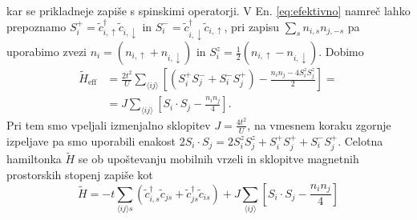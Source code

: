 \documentclass[10pt,a4paper]{article}
\begin{document}
kar se prikladneje zapiše s spinskimi operatorji. V En. \eqref{eq:efektivno} namreč lahko prepoznamo $S_i^+=\tilde{c}^\dagger_{i,\uparrow}\tilde{c}_{i,\downarrow}$ in $S_i^-=\tilde{c}^\dagger_{i,\downarrow}\tilde{c}_{i,\uparrow}$, pri zapisu $\sum\limits_{s} n_{i,s}n_{j,-s}$ pa uporabimo zvezi $n_i=\left( n_{i,\uparrow} + n_{i, \downarrow}\right)$ in $S_i^z=\frac{1}{2}\left(n_{i, \uparrow} - n_{i, \downarrow} \right)$. Dobimo
\begin{equation}\label{eq:stanja}
\begin{split}
\tilde{H}_\mathrm{eff}& = \frac{2t^2}{U} \sum\limits_{\langle ij \rangle}\left[ \left( S_i^+S_j^- + S_i^-S_j^+\right) - \frac{n_i n_j - 4S_i^zS_j^z}{2}\right]=\\
&=J\sum\limits_{\langle ij \rangle} \left[ S_i\cdot  S_j - \frac{n_i n_j}{4}\right].
\end{split}
\end{equation}
Pri tem smo vpeljali izmenjalno sklopitev $J=\frac{4t^2}{U}$, na vmesnem koraku zgornje izpeljave pa smo uporabili enakost $2S_i\cdot S_j = 2S_i^z S_j^z + S_i^+S_j^+ + S_i^-S_j^+$. Celotna hamiltonka $\tilde{H}$ se ob upoštevanju mobilnih vrzeli in sklopitve magnetnih prostorskih stopenj zapiše kot 
\begin{equation}\label{eq:tjhamiltonka}
\tilde{H} = -t\sum\limits_{\langle ij \rangle s} \left(\tilde{c}^\dagger_{i,s} \tilde{c}_{js} + \tilde{c}^\dagger_{js}\tilde{c}_{is}\right) +  J\sum\limits_{\langle ij \rangle} \left[ S_i\cdot  S_j - \frac{n_i n_j}{4}\right]
\end{equation}
\end{document}
